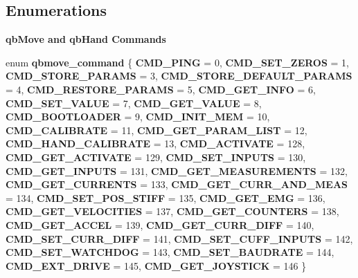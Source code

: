 \subsection*{Enumerations}
\begin{Indent}\textbf{ qb\+Move and qb\+Hand Commands}\par
\begin{DoxyCompactItemize}
\item 
enum \textbf{ qbmove\+\_\+command} \{ \newline
\textbf{ C\+M\+D\+\_\+\+P\+I\+NG} = 0, 
\textbf{ C\+M\+D\+\_\+\+S\+E\+T\+\_\+\+Z\+E\+R\+OS} = 1, 
\textbf{ C\+M\+D\+\_\+\+S\+T\+O\+R\+E\+\_\+\+P\+A\+R\+A\+MS} = 3, 
\textbf{ C\+M\+D\+\_\+\+S\+T\+O\+R\+E\+\_\+\+D\+E\+F\+A\+U\+L\+T\+\_\+\+P\+A\+R\+A\+MS} = 4, 
\newline
\textbf{ C\+M\+D\+\_\+\+R\+E\+S\+T\+O\+R\+E\+\_\+\+P\+A\+R\+A\+MS} = 5, 
\textbf{ C\+M\+D\+\_\+\+G\+E\+T\+\_\+\+I\+N\+FO} = 6, 
\textbf{ C\+M\+D\+\_\+\+S\+E\+T\+\_\+\+V\+A\+L\+UE} = 7, 
\textbf{ C\+M\+D\+\_\+\+G\+E\+T\+\_\+\+V\+A\+L\+UE} = 8, 
\newline
\textbf{ C\+M\+D\+\_\+\+B\+O\+O\+T\+L\+O\+A\+D\+ER} = 9, 
\textbf{ C\+M\+D\+\_\+\+I\+N\+I\+T\+\_\+\+M\+EM} = 10, 
\textbf{ C\+M\+D\+\_\+\+C\+A\+L\+I\+B\+R\+A\+TE} = 11, 
\textbf{ C\+M\+D\+\_\+\+G\+E\+T\+\_\+\+P\+A\+R\+A\+M\+\_\+\+L\+I\+ST} = 12, 
\newline
\textbf{ C\+M\+D\+\_\+\+H\+A\+N\+D\+\_\+\+C\+A\+L\+I\+B\+R\+A\+TE} = 13, 
\textbf{ C\+M\+D\+\_\+\+A\+C\+T\+I\+V\+A\+TE} = 128, 
\textbf{ C\+M\+D\+\_\+\+G\+E\+T\+\_\+\+A\+C\+T\+I\+V\+A\+TE} = 129, 
\textbf{ C\+M\+D\+\_\+\+S\+E\+T\+\_\+\+I\+N\+P\+U\+TS} = 130, 
\newline
\textbf{ C\+M\+D\+\_\+\+G\+E\+T\+\_\+\+I\+N\+P\+U\+TS} = 131, 
\textbf{ C\+M\+D\+\_\+\+G\+E\+T\+\_\+\+M\+E\+A\+S\+U\+R\+E\+M\+E\+N\+TS} = 132, 
\textbf{ C\+M\+D\+\_\+\+G\+E\+T\+\_\+\+C\+U\+R\+R\+E\+N\+TS} = 133, 
\textbf{ C\+M\+D\+\_\+\+G\+E\+T\+\_\+\+C\+U\+R\+R\+\_\+\+A\+N\+D\+\_\+\+M\+E\+AS} = 134, 
\newline
\textbf{ C\+M\+D\+\_\+\+S\+E\+T\+\_\+\+P\+O\+S\+\_\+\+S\+T\+I\+FF} = 135, 
\textbf{ C\+M\+D\+\_\+\+G\+E\+T\+\_\+\+E\+MG} = 136, 
\textbf{ C\+M\+D\+\_\+\+G\+E\+T\+\_\+\+V\+E\+L\+O\+C\+I\+T\+I\+ES} = 137, 
\textbf{ C\+M\+D\+\_\+\+G\+E\+T\+\_\+\+C\+O\+U\+N\+T\+E\+RS} = 138, 
\newline
\textbf{ C\+M\+D\+\_\+\+G\+E\+T\+\_\+\+A\+C\+C\+EL} = 139, 
\textbf{ C\+M\+D\+\_\+\+G\+E\+T\+\_\+\+C\+U\+R\+R\+\_\+\+D\+I\+FF} = 140, 
\textbf{ C\+M\+D\+\_\+\+S\+E\+T\+\_\+\+C\+U\+R\+R\+\_\+\+D\+I\+FF} = 141, 
\textbf{ C\+M\+D\+\_\+\+S\+E\+T\+\_\+\+C\+U\+F\+F\+\_\+\+I\+N\+P\+U\+TS} = 142, 
\newline
\textbf{ C\+M\+D\+\_\+\+S\+E\+T\+\_\+\+W\+A\+T\+C\+H\+D\+OG} = 143, 
\textbf{ C\+M\+D\+\_\+\+S\+E\+T\+\_\+\+B\+A\+U\+D\+R\+A\+TE} = 144, 
\textbf{ C\+M\+D\+\_\+\+E\+X\+T\+\_\+\+D\+R\+I\+VE} = 145, 
\textbf{ C\+M\+D\+\_\+\+G\+E\+T\+\_\+\+J\+O\+Y\+S\+T\+I\+CK} = 146
 \}
\end{DoxyCompactItemize}
\end{Indent}
